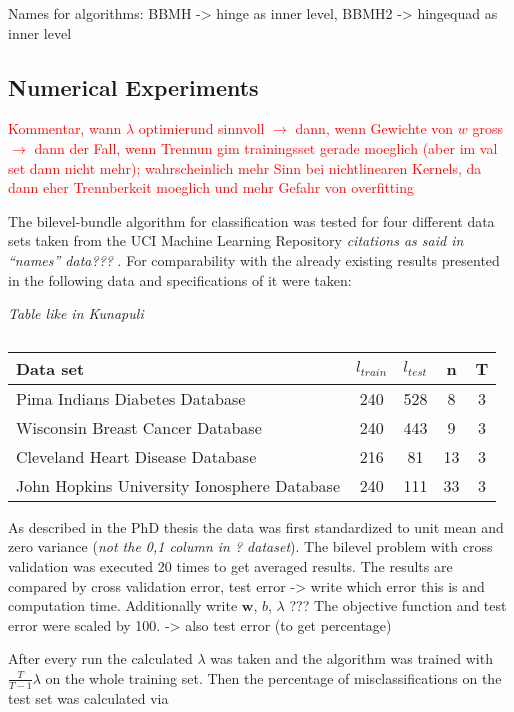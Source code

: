 Names for algorithms: BBMH -> hinge as inner level, BBMH2 -> hingequad as inner level 

\subsection{Numerical Experiments}

\textcolor{red}{Kommentar, wann \(\lambda\) optimierund sinnvoll \(\to\) dann, wenn Gewichte von \(w\) gross \(\to \) dann der Fall, wenn Trennun gim trainingsset gerade moeglich (aber im val set dann nicht mehr); wahrscheinlich mehr Sinn bei nichtlinearen Kernels, da dann eher Trennberkeit moeglich und mehr Gefahr von overfitting}

The bilevel-bundle algorithm for classification was tested for four different data sets taken from the UCI Machine Learning Repository \emph{citations as said in ``names'' data??? }.
For comparability with the already existing results presented in \cite{Kunapuli2008} the following data and specifications of it were taken:

\begin{center}
\emph{Table like in Kunapuli}
\begin{table}[H]%
	\begin{tabular}{lcccc}
		\hline
    Data set & \(l_{train}\) & \(l_{test}\) & n & T \\
		\hline
		Pima Indians Diabetes Database & 240 & 528 & 8 & 3 \\
		Wisconsin Breast Cancer Database & 240 & 443 & 9 & 3 \\
		Cleveland Heart Disease Database & 216 & 81 & 13 & 3 \\
		John Hopkins University Ionosphere Database & 240 & 111 & 33 & 3
	\end{tabular}
	\caption{}
	\label{}
\end{table}
\end{center}

As described in the PhD thesis the data was first standardized to unit mean and zero variance (\emph{not the 0,1 column in ? dataset}). The bilevel problem with cross validation was executed 20 times to get averaged results.
The results are compared by cross validation error, test error -> write which error this is and computation time.
Additionally write \(\bm{w}\), \(b\), \(\lambda\) ???
The objective function and test error were scaled by 100. -> also test error (to get percentage) 

After every run the calculated \(\lambda\) was taken and the algorithm was trained with \(\frac{T}{T-1} \lambda\) on the whole training set.
Then the percentage of misclassifications on the test set was calculated via

